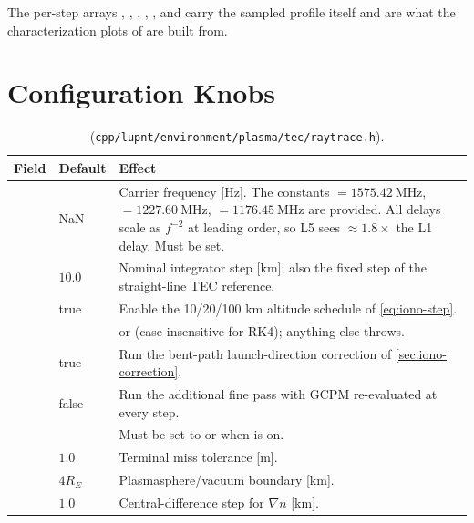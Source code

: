 The per-step arrays , , , ,
,  and  carry the sampled
profile itself and are what the characterization plots of
\citep[Ch.~5]{iiyama2026thesis} are built from.

\section{Configuration Knobs}
\label{sec:iono-config}

\begin{table}[htbp]
  \centering
  \caption{ (\texttt{cpp/lupnt/environment/plasma/tec/raytrace.h}).}
  \label{tab:iono-config}
  \small
  \begin{tabularx}{\textwidth}{llL}
    \toprule
    Field & Default & Effect \\
    \midrule
       & NaN & Carrier frequency [\si{\hertz}].  The constants  $=\SI{1575.42}{\mega\hertz}$,  $=\SI{1227.60}{\mega\hertz}$,  $=\SI{1176.45}{\mega\hertz}$ are provided.  All delays scale as $f^{-2}$ at leading order, so L5 sees $\approx 1.8\times$ the L1 delay.  Must be set. \\
     & $10.0$ & Nominal integrator step [\si{\kilo\meter}]; also the fixed step of the straight-line TEC reference. \\
     & true & Enable the 10/20/100 \si{\kilo\meter} altitude schedule of \cref{eq:iono-step}. \\
     &  &  or  (case-insensitive for RK4); anything else throws. \\
     & true & Run the bent-path launch-direction correction of \cref{sec:iono-correction}. \\
     & false & Run the additional fine pass with GCPM re-evaluated at every step. \\
     &  & Must be set to  or  when  is on. \\
     & $1.0$ & Terminal miss tolerance [\si{\meter}]. \\
     & $4R_E$ & Plasmasphere/vacuum boundary [\si{\kilo\meter}]. \\
     & $1.0$ & Central-difference step for $\nabla n$ [\si{\kilo\meter}]. \\

\end{tabularx}
\end{table}
